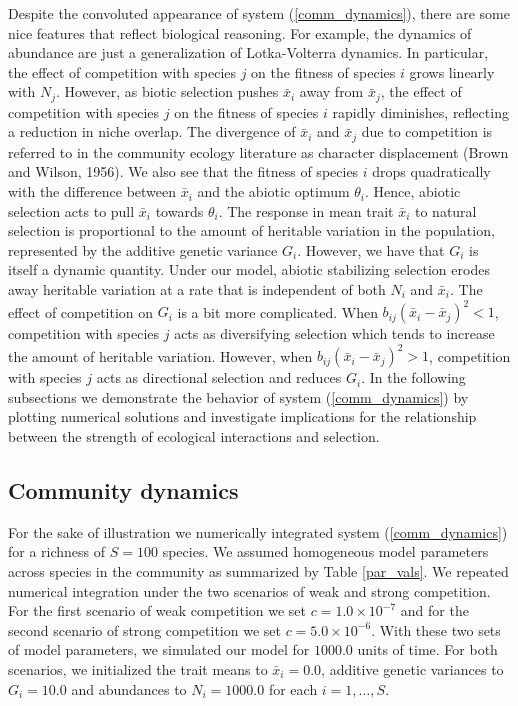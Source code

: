 \documentclass[]{elsarticle} %
\begin{document}
Despite the convoluted appearance of system (\ref{comm_dynamics}), there
are some nice features that reflect biological reasoning. For example,
the dynamics of abundance are just a generalization of Lotka-Volterra
dynamics. In particular, the effect of competition with species \(j\) on
the fitness of species \(i\) grows linearly with \(N_j\). However, as
biotic selection pushes \(\bar x_i\) away from \(\bar x_j\), the effect
of competition with species \(j\) on the fitness of species \(i\)
rapidly diminishes, reflecting a reduction in niche overlap. The
divergence of \(\bar x_i\) and \(\bar x_j\) due to competition is
referred to in the community ecology literature as character
displacement (Brown and Wilson, 1956). We also see that the fitness of
species \(i\) drops quadratically with the difference between
\(\bar x_i\) and the abiotic optimum \(\theta_i\). Hence, abiotic
selection acts to pull \(\bar x_i\) towards \(\theta_i\). The response
in mean trait \(\bar x_i\) to natural selection is proportional to the
amount of heritable variation in the population, represented by the
additive genetic variance \(G_i\). However, we have that \(G_i\) is
itself a dynamic quantity. Under our model, abiotic stabilizing
selection erodes away heritable variation at a rate that is independent
of both \(N_i\) and \(\bar x_i\). The effect of competition on \(G_i\)
is a bit more complicated. When \(b_{ij}(\bar x_i-\bar x_j)^2<1\),
competition with species \(j\) acts as diversifying selection which
tends to increase the amount of heritable variation. However, when
\(b_{ij}(\bar x_i-\bar x_j)^2>1\), competition with species \(j\) acts
as directional selection and reduces \(G_i\). In the following
subsections we demonstrate the behavior of system (\ref{comm_dynamics})
by plotting numerical solutions and investigate implications for the
relationship between the strength of ecological interactions and
selection.

\hypertarget{community-dynamics}{%
\subsection{\texorpdfstring{Community dynamics
\label{dynamics}}{Community dynamics }}\label{community-dynamics}}

For the sake of illustration we numerically integrated system
(\ref{comm_dynamics}) for a richness of \(S=100\) species. We assumed
homogeneous model parameters across species in the community as
summarized by Table \ref{par_vals}. We repeated numerical integration
under the two scenarios of weak and strong competition. For the first
scenario of weak competition we set \(c=1.0\times10^{-7}\) and for the
second scenario of strong competition we set \(c=5.0\times10^{-6}\).
With these two sets of model parameters, we simulated our model for
\(1000.0\) units of time. For both scenarios, we initialized the trait
means to \(\bar x_i=0.0\), additive genetic variances to \(G_i=10.0\)
and abundances to \(N_i=1000.0\) for each \(i=1,\dots,S\).
\end{document}
